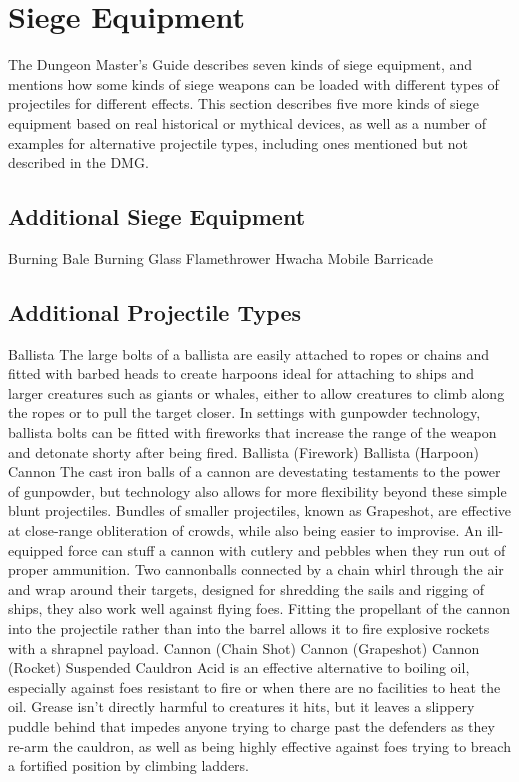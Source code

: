 \documentclass[10pt,a4paper,twoside,twocolumn,openany,bg=print,nodeprecatedcode]{dndbook}
\begin{document}
\chapter{Siege Equipment}
The Dungeon Master's Guide describes seven kinds of siege equipment, and mentions how some kinds of siege weapons can be loaded with different types of projectiles for different effects. This section describes five more kinds of siege equipment based on real historical or mythical devices, as well as a number of examples for alternative projectile types, including ones mentioned but not described in the DMG.
\section{Additional Siege Equipment}
Burning Bale
Burning Glass
Flamethrower
Hwacha
Mobile Barricade
\section{Additional Projectile Types}
Ballista
The large bolts of a ballista are easily attached to ropes or chains and fitted with barbed heads to create harpoons ideal for attaching to ships and larger creatures such as giants or whales, either to allow creatures to climb along the ropes or to pull the target closer.
In settings with gunpowder technology, ballista bolts can be fitted with fireworks that increase the range of the weapon and detonate shorty after being fired.
Ballista (Firework)
Ballista (Harpoon)
Cannon
The cast iron balls of a cannon are devestating testaments to the power of gunpowder, but technology also allows for more flexibility beyond these simple blunt projectiles.
Bundles of smaller projectiles, known as Grapeshot, are effective at close-range obliteration of crowds, while also being easier to improvise. An ill-equipped force can stuff a cannon with cutlery and pebbles when they run out of proper ammunition.
Two cannonballs connected by a chain whirl through the air and wrap around their targets, designed for shredding the sails and rigging of ships, they also work well against flying foes.
Fitting the propellant of the cannon into the projectile rather than into the barrel allows it to fire explosive  rockets with a shrapnel payload.
Cannon (Chain Shot)
Cannon (Grapeshot)
Cannon (Rocket)
Suspended Cauldron
Acid is an effective alternative to boiling oil, especially against foes resistant to fire or when there are no facilities to heat the oil.
Grease isn't directly harmful to creatures it hits, but it leaves a slippery puddle behind that impedes anyone trying to charge past the defenders as they re-arm the cauldron, as well as being highly effective against foes trying to breach a fortified position by climbing ladders.
\end{document}
